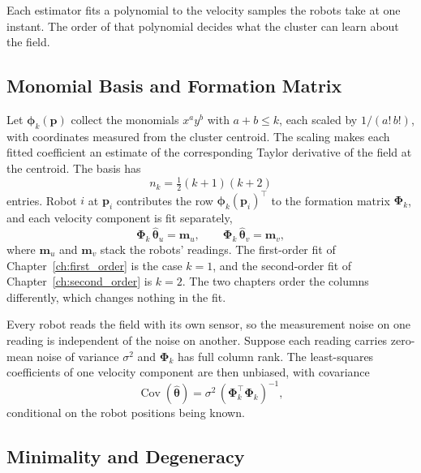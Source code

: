 Each estimator fits a polynomial to the velocity samples the robots take
at one instant. The order of that polynomial decides what the cluster can
learn about the field.

\subsection{Monomial Basis and Formation Matrix}
\label{sec:ch4:basis}

Let $\boldsymbol{\phi}_k(\mathbf{p})$ collect the monomials $x^a y^b$
with $a + b \leq k$, each scaled by $1/(a!\,b!)$, with coordinates
measured from the cluster centroid. The scaling makes each fitted
coefficient an estimate of the corresponding Taylor derivative of the field
at the centroid. The basis
has
\begin{equation}
    n_k = \tfrac{1}{2}(k+1)(k+2)
    \label{eq:ch4:nk}
\end{equation}
entries. Robot $i$ at $\mathbf{p}_i$ contributes the row
$\boldsymbol{\phi}_k(\mathbf{p}_i)^{\top}$ to the formation matrix
$\boldsymbol{\Phi}_k$, and each velocity component is fit separately,
\begin{equation}
    \boldsymbol{\Phi}_k\,\hat{\boldsymbol{\theta}}_u = \mathbf{m}_u, \qquad
    \boldsymbol{\Phi}_k\,\hat{\boldsymbol{\theta}}_v = \mathbf{m}_v ,
    \label{eq:ch4:fit}
\end{equation}
where $\mathbf{m}_u$ and $\mathbf{m}_v$ stack the robots' readings. The
first-order fit of Chapter~\ref{ch:first_order} is the case $k = 1$, and
the second-order fit of Chapter~\ref{ch:second_order} is $k = 2$. The two
chapters order the columns differently, which changes nothing in the fit.

Every robot reads the field with its own sensor, so the measurement noise
on one reading is independent of the noise on another. Suppose each
reading carries zero-mean noise of variance $\sigma^2$ and
$\boldsymbol{\Phi}_k$ has full column rank. The least-squares coefficients
of one velocity component are then unbiased, with covariance
\begin{equation}
    \operatorname{Cov}(\hat{\boldsymbol{\theta}}) =
    \sigma^{2}\,(\boldsymbol{\Phi}_k^{\top}\boldsymbol{\Phi}_k)^{-1},
    \label{eq:ch4:cov}
\end{equation}
conditional on the robot positions being known.

\subsection{Minimality and Degeneracy}
\label{sec:ch4:minimality}

